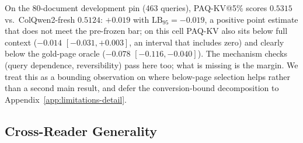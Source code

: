 \documentclass[letterpaper]{article} %
\newcommand{\paqc}{\textsc{PAQ-KV}}
\newcommand{\lb}{\mathrm{LB}_{95}}
\begin{document}
On the 80-document development pin (463 queries), \paqc{}@5\% scores $0.5315$ vs.\ ColQwen2-fresh $0.5124$: $+0.019$ with $\lb=-0.019$, a positive point estimate that does not meet the pre-frozen bar; on this cell \paqc{} also sits below full context ($-0.014$ $[-0.031,+0.003]$, an interval that includes zero) and clearly below the gold-page oracle ($-0.078$ $[-0.116,-0.040]$). The mechanism checks (query dependence, reversibility) pass here too; what is missing is the margin. We treat this as a bounding observation on where below-page selection helps rather than a second main result, and defer the conversion-bound decomposition to Appendix~\ref{app:limitations-detail}.

\subsection{Cross-Reader Generality}\label{sec:results-crossreader}
\end{document}
